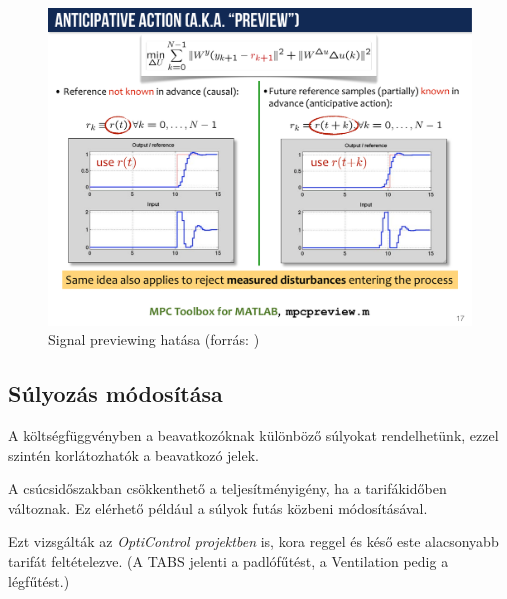 \begin{figure}[H]
	\centering
	\includegraphics[trim=10 50 10 0, clip,width=\textwidth]{figures/onlab/preview}
	\caption{Signal previewing hatása (forrás: \cite{BemporadLecture1})}
	\label{fig:preview-bemporad}
\end{figure}

\subsection{Súlyozás módosítása} A költségfüggvényben a beavatkozóknak különböző súlyokat rendelhetünk, ezzel szintén korlátozhatók a beavatkozó jelek. 

A csúcsidőszakban csökkenthető a teljesítményigény, ha a tarifákidőben változnak. Ez elérhető például a súlyok futás közbeni módosításával.

Ezt vizsgálták az \textit{OptiControl projektben} \cite{Opticontrol-II} is, kora reggel és késő este alacsonyabb tarifát feltételezve. (A TABS jelenti a padlófűtést, a Ventilation pedig a légfűtést.)



